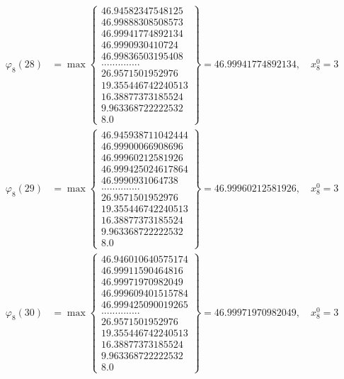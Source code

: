 \documentclass{article}
\begin{document}
\begin{align*}
  
  
  
\varphi_{8}(28) &= \max \left\{ \begin{array}{c}
46.94582347548125 \\
 46.99888308508573 \\
 46.99941774892134 \\
 46.9990930410724 \\
 46.99836503195408 \\
 .............. \\
 26.9571501952976 \\
 19.355446742240513 \\
 16.38877373185524 \\
 9.963368722222532 \\
 8.0
\end{array} \right\} = 46.99941774892134, \quad x_{8}^0 = 3\\
  
  
  
  
\varphi_{8}(29) &= \max \left\{ \begin{array}{c}
46.945938711042444 \\
 46.99900066908696 \\
 46.99960212581926 \\
 46.999425024617864 \\
 46.9990931064738 \\
 .............. \\
 26.9571501952976 \\
 19.355446742240513 \\
 16.38877373185524 \\
 9.963368722222532 \\
 8.0
\end{array} \right\} = 46.99960212581926, \quad x_{8}^0 = 3\\
  
  
  
  
\varphi_{8}(30) &= \max \left\{ \begin{array}{c}
46.946010640575174 \\
 46.99911590464816 \\
 46.99971970982049 \\
 46.999609401515784 \\
 46.999425090019265 \\
 .............. \\
 26.9571501952976 \\
 19.355446742240513 \\
 16.38877373185524 \\
 9.963368722222532 \\
 8.0
\end{array} \right\} = 46.99971970982049, \quad x_{8}^0 = 3\\
  

\end{align*}
\end{document}
